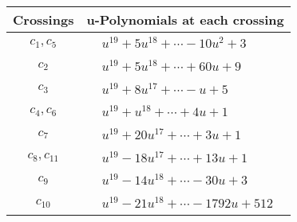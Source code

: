 \documentclass[1p]{elsarticle_modified}
\theoremstyle{definition}
\begin{document}
\begin{tabular}{m{50pt}|m{274pt}}
Crossings & \hspace{64pt}u-Polynomials at each crossing \\
\hline $$\begin{aligned}c_{1},c_{5}\end{aligned}$$&$\begin{aligned}
&u^{19}+5 u^{18}+\cdots-10 u^2+3
\end{aligned}$\\
\hline $$\begin{aligned}c_{2}\end{aligned}$$&$\begin{aligned}
&u^{19}+5 u^{18}+\cdots+60 u+9
\end{aligned}$\\
\hline $$\begin{aligned}c_{3}\end{aligned}$$&$\begin{aligned}
&u^{19}+8 u^{17}+\cdots- u+5
\end{aligned}$\\
\hline $$\begin{aligned}c_{4},c_{6}\end{aligned}$$&$\begin{aligned}
&u^{19}+u^{18}+\cdots+4 u+1
\end{aligned}$\\
\hline $$\begin{aligned}c_{7}\end{aligned}$$&$\begin{aligned}
&u^{19}+20 u^{17}+\cdots+3 u+1
\end{aligned}$\\
\hline $$\begin{aligned}c_{8},c_{11}\end{aligned}$$&$\begin{aligned}
&u^{19}-18 u^{17}+\cdots+13 u+1
\end{aligned}$\\
\hline $$\begin{aligned}c_{9}\end{aligned}$$&$\begin{aligned}
&u^{19}-14 u^{18}+\cdots-30 u+3
\end{aligned}$\\
\hline $$\begin{aligned}c_{10}\end{aligned}$$&$\begin{aligned}
&u^{19}-21 u^{18}+\cdots-1792 u+512
\end{aligned}$\\
\hline
\end{tabular}\\~\\
\end{document}
